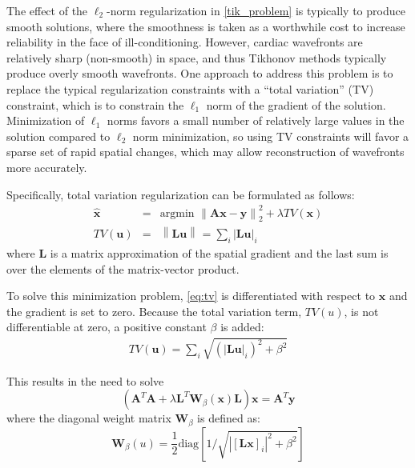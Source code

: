 The effect of the $\ell_{2}$-norm regularization in \autoref{tik_problem} is
typically to produce smooth solutions, where the smoothness is taken as a
worthwhile cost to increase reliability in the face of
ill-conditioning. However, cardiac wavefronts are relatively sharp
(non-smooth) in space, and thus Tikhonov methods typically produce overly
smooth wavefronts. One approach to address this problem is to replace the
typical regularization constraints with a ``total variation'' (TV) constraint,
which is to constrain the $\ell_{1}$ norm of the gradient of the
solution. Minimization of $\ell_{1}$ norms favors a small number of
relatively large values in the solution compared to $\ell_{2}$ norm
minimization, so using TV constraints will favor a sparse set of
rapid spatial changes, which may allow reconstruction of wavefronts more
accurately.

Specifically, total variation regularization can be formulated as follows:
%
\begin{eqnarray}
     \mathbf{\hat{x}} &=& \mbox{argmin   } \left\|\mathbf{A}\mathbf{x} -
     \mathbf{y}\right\|^2_{2} + \lambda TV(\mathbf{x}) \label{eq:tv} \\
     TV(\mathbf{u}) &=&  \left\| \mathbf{L}\mathbf{u} \right\|_{} = \sum_i |\mathbf{L}\mathbf{u}|_i \label{eq:tv-term}
\end{eqnarray}
%
\noindent where $\mathbf{L}$ is a matrix approximation of the spatial gradient and
the last sum is over the elements of the matrix-vector product.


To solve this minimization problem, \autoref{eq:tv} is differentiated
with respect to $\mathbf{x}$ and the gradient is set to zero. Because the total variation term, $TV(u)$, is not differentiable at zero, a positive constant $\beta$ is added:
%
\begin{eqnarray} \label{eqn:tv-term2}
TV(\mathbf{u}) = \sum_i \sqrt{(|\mathbf{L}\mathbf{u}|_i)^2 + \beta^2}
\end{eqnarray}

This results in the need to solve
%
\begin{equation}\label{eq:tv3}
(\mathbf{A}^T\mathbf{A}+\lambda
\mathbf{L}^T\mathbf{W}_{\beta}(\mathbf{x})\mathbf{L}) \mathbf{x} =
\mathbf{A}^T\mathbf{y}
\end{equation}
%
\noindent where the diagonal weight matrix $\mathbf{W}_{\beta}$ is defined as:
%
\begin{equation} \label{eq:tv-weightmat}
\mathbf{W}_{\beta}(u) = \frac{1}{2} \mbox{diag} \left[ 1 / \sqrt{|[\mathbf{L}\mathbf{x}]_i|^2 + \beta^2}\right]
\end{equation}

